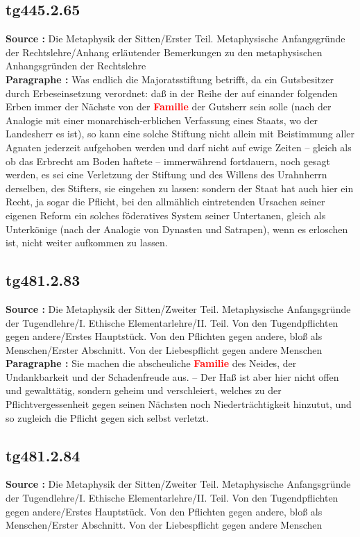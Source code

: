 \documentclass[a4paper,12pt,twoside]{book}
\newcommand{\match}[1]{\textcolor{red}{\textbf{#1}}}
\begin{document}
	\subsection*{tg445.2.65} 
	\textbf{Source : }Die Metaphysik der Sitten/Erster Teil. Metaphysische Anfangsgründe der Rechtslehre/Anhang erläutender Bemerkungen zu den metaphysischen Anhangsgründen der Rechtslehre\\  
	
	\textbf{Paragraphe : }Was endlich die Majoratsstiftung betrifft, da ein Gutsbesitzer durch Erbeseinsetzung verordnet: daß in der Reihe der auf einander folgenden Erben immer der Nächste von der \match{Familie} der Gutsherr sein solle (nach der Analogie mit einer monarchisch-erblichen Verfassung eines Staats, wo der Landesherr es ist), so kann eine solche Stiftung nicht allein mit Beistimmung aller Agnaten jederzeit aufgehoben werden und darf nicht auf ewige Zeiten – gleich als ob das Erbrecht am Boden haftete – immerwährend fortdauern, noch gesagt werden, es sei eine Verletzung der Stiftung und des Willens des Urahnherrn derselben, des Stifters, sie eingehen zu lassen: sondern der Staat hat auch hier ein Recht, ja sogar die Pflicht, bei den allmählich eintretenden Ursachen seiner eigenen Reform ein solches föderatives System seiner Untertanen, gleich als Unterkönige (nach der Analogie von Dynasten und Satrapen), wenn es erloschen ist, nicht weiter aufkommen zu lassen. 
	
	\subsection*{tg481.2.83} 
	\textbf{Source : }Die Metaphysik der Sitten/Zweiter Teil. Metaphysische Anfangsgründe der Tugendlehre/I. Ethische Elementarlehre/II. Teil. Von den Tugendpflichten gegen andere/Erstes Hauptstück. Von den Pflichten gegen andere, bloß als Menschen/Erster Abschnitt. Von der Liebespflicht gegen andere Menschen\\  
	
	\textbf{Paragraphe : }Sie machen die abscheuliche \match{Familie} des Neides, der Undankbarkeit und der Schadenfreude aus. – Der Haß ist aber hier nicht offen und gewalttätig, sondern geheim und verschleiert, welches zu der Pflichtvergessenheit gegen seinen Nächsten noch Niederträchtigkeit hinzutut, und so zugleich die Pflicht gegen sich selbst verletzt. 
	
	\subsection*{tg481.2.84} 
	\textbf{Source : }Die Metaphysik der Sitten/Zweiter Teil. Metaphysische Anfangsgründe der Tugendlehre/I. Ethische Elementarlehre/II. Teil. Von den Tugendpflichten gegen andere/Erstes Hauptstück. Von den Pflichten gegen andere, bloß als Menschen/Erster Abschnitt. Von der Liebespflicht gegen andere Menschen\\  
	
\end{document}
